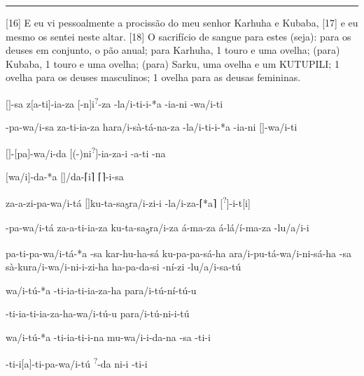 \vspace{10pt}
\hrule
\vspace{10pt}


[16] E eu vi pessoalmente a procissão do meu senhor Karhuha e Kubaba,
[17] e eu mesmo os sentei neste altar.
	[18] O sacrifício de sangue para estes (seja):
para os deuses em conjunto, o pão anual;
para Karhuha, 1 touro e uma ovelha;
(para) Kubaba, 1 touro e uma ovelha;
(para) Sarku, uma ovelha e um KUTUPILI\@;
1 ovelha para os deuses masculinos;
1 ovelha para as deusas femininas.

\clearpage

\setcounter{parcount}{18}
\begin{parnumbersa}[]

	\raggedright%
	\itshape%


	$[$\logo{\ldots{}}$]$-sa z$[$a-ti$]$-ia-za $[$-n$]$i\textsuperscript{?}-za -la/i-ti-i-*a \lbreak{} -ia-ni \lmasc{}-wa/i-ti

	\lmasc{}-pa-wa/i-sa \lmasc{}za-ti-ia-za ha\logo{+}ra/i-sà-tá-na-za -la/i-ti-i-*a \lmasc{}-ia-ni $[$$]$-wa/i-ti

	$[$\lmasc{}$]$-$[$pa$]$-wa/i-da
	$[${(-)}ni\textsuperscript{?}$]$-ia-za-i -a-ti -na

	$[$wa/i$]$-da-*a $[$$]$/da-\textsc{⌈}i\textsc{⌉} \textsc{⌈}\lmasc{}\textsc{⌉}-i-sa

	\lmasc{}za-a-zi-pa-wa/i-tá
	$[$$]$ku-ta-sa\textsubscript{5}\logo{+}ra/i-zi-i
	-la/i-za-\textsc{⌈}*a\textsc{⌉} [\textsuperscript{?}]\lbreak{}-i-t[i]

	\lmasc{}-pa-wa/i-tá \lmasc{}za-a-ti-ia-za
	\lmasc{}ku-ta-sa\textsubscript{5}\logo{+}ra/i-za \lmasc{}á-ma-za \lmasc{}á-lá/í-ma-za \lmasc{} \lmasc{}-lu/a/i-i

	pa-ti-pa-wa/i-tá-*a  -sa kar-hu-ha-sá ku-pa-pa-sá-ha a\logo{+}ra/i-pu-tá-wa/i-ni-sá-ha -sa sà-ku\logo{+}ra/i-wa/i-ni-i-zi-ha ha\lbreak{}-pa-da-si -ní-zi \lmasc{}-lu/a/i-sa-tú

	wa/i-tú-*a \lmasc{}-ti-ia-ti-ia-za-ha \lmasc{}pa\logo{+}ra/i-tú-ní-tú-u

	-ti-ia-ti-ia-za-ha-wa/i-tú-u \lmasc{}pa\logo{+}ra/i-tú-ni-i-tú

	wa/i-tú-*a \lmasc{}-ti-ia-ti-i-na \lmasc{}mu-wa/i-i-da-na -sa \lmasc{}-ti-i

	-ti-i$[$a$]$-ti-pa-wa/i-tú
	\textsuperscript{?}-da \lmasc{}ni-i \lmasc{}-ti-i


\end{parnumbersa}

